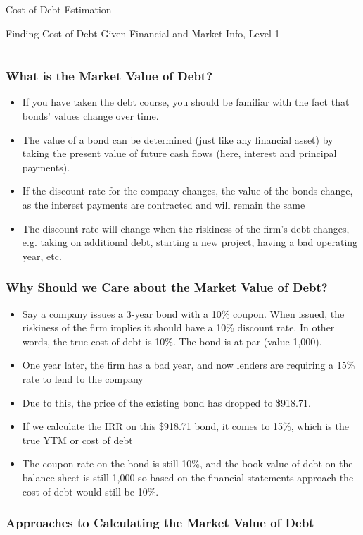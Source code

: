 \documentclass[handout, 11pt]{beamer}
\begin{document}
\begin{section}[Debt]{Cost of Debt Estimation}
\begin{frame}
{\begin{block}{Finding Cost of Debt Given Financial and Market Info, Level 1}
\begin{tabular*}{\textwidth}{@{\extracolsep{\fill}}ccccc}
\end{tabular*}
\end{block}
}
\label{labs:dcf-cost-of-debt-lab-1}
\end{frame}
\begin{frame}
\frametitle{What is the Market Value of Debt?}
\begin{itemize}
\item If you have taken the debt course, you should be familiar with the fact that bonds' values change over time.
\vfill
\item The value of a bond can be determined (just like any financial asset) by taking the present value of future cash flows (here, interest and principal payments). 
\vfill
\item If the discount rate for the company changes, the value of the bonds change, as the interest payments are contracted and will remain the same
\vfill
\item The discount rate will change when the riskiness of the firm's debt changes, e.g. taking on additional debt, starting a new project, having a bad operating year, etc.
\end{itemize}
\end{frame}
\begin{frame}
\frametitle{Why Should we Care about the Market Value of Debt?}
\begin{itemize}
\item Say a company issues a 3-year bond with a 10\% coupon. When issued, the riskiness of the firm implies it should have a 10\% discount rate. In other words, the true cost of debt is 10\%. The bond is at par (value 1,000).
\vfill
\item One year later, the firm has a bad year, and now lenders are requiring a 15\% rate to lend to the company
\vfill
\item Due to this, the price of the existing bond has dropped to \$918.71.
\vfill
\item If we calculate the IRR on this \$918.71 bond, it comes to 15\%, which is the true YTM or cost of debt
\vfill
\item The coupon rate on the bond is still 10\%, and the book value of debt on the balance sheet is still 1,000 so based on the financial statements approach the cost of debt would still be 10\%.
\end{itemize}
\end{frame}
\begin{frame}
\frametitle{Approaches to Calculating the Market Value of Debt}
\begin{itemize}

\end{itemize}
\end{frame}
\end{section}
\end{document}
